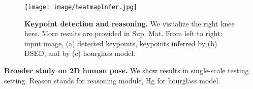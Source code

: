 \begin{figure}
    \centering
    \texttt{[image: image/heatmapInfer.jpg]}  
    \caption{\textbf{Keypoint detection and reasoning.} We visualize the right knee here. More results are provided in Sup. Mat. From left to right: input image, (a) detected keypoints, keypoints inferred by (b) DSED, and by (c) hourglass model.}
    \label{fig:KP}
\end{figure}

\begin{table}
    \small 
    \centering
    \caption{\textbf{Broader study on 2D human pose.} We show results in single-scale testing setting. Reason stands for reasoning module, Hg for hourglass model.}
    \label{table:broader}
    \begin{subtable}[t]{0.495\textwidth}
        \caption{COCO val-dev 2017}
    \end{subtable}
    \begin{subtable}[t]{.495\textwidth}
\end{subtable}
\end{table}
